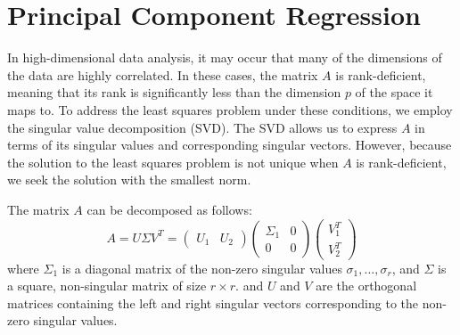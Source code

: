 \section{Principal Component Regression}
In high-dimensional data analysis, it may occur that many of the dimensions of the data are highly correlated.
In these cases, the matrix $A$ is rank-deficient, meaning that its rank is significantly less than the dimension $p$ of
the space it maps to. To address the least squares problem under these conditions,
we employ the singular value decomposition (SVD). The SVD allows us to express $A$ in terms of its singular values and corresponding singular vectors. However, because the solution to the least squares problem is not unique when $A$ is rank-deficient, we seek the solution with the smallest norm.

The matrix $A$ can be decomposed as follows:
\[
A = U \Sigma V^T =
\begin{pmatrix} U_1 & U_2 \end{pmatrix}
\begin{pmatrix}
\Sigma_1 & 0 \\
0 & 0 
\end{pmatrix} \begin{pmatrix}
V_1^T \\
V_2^T
\end{pmatrix}
\]
where $\Sigma_1$ is a diagonal matrix of the non-zero singular values $\sigma_1, \ldots, \sigma_r$, and $\Sigma$ is a square, non-singular matrix of size $r \times r$.
and $U$ and $V$ are the orthogonal matrices containing the left and right singular vectors corresponding to the non-zero singular values.

